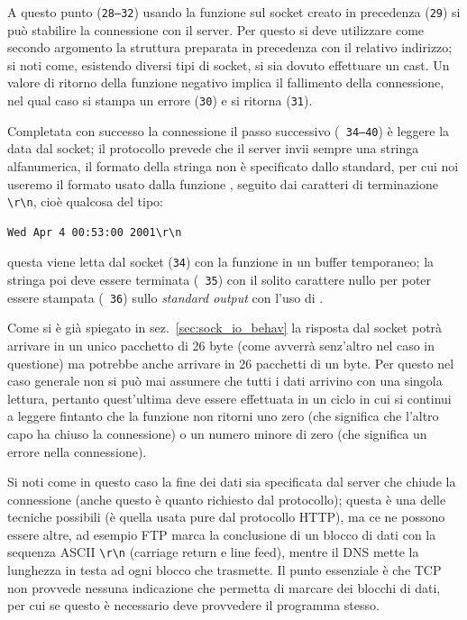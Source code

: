 A questo punto (\texttt{\small 28--32}) usando la funzione  sul
socket creato in precedenza (\texttt{\small 29}) si può stabilire la
connessione con il server. Per questo si deve utilizzare come secondo
argomento la struttura preparata in precedenza con il relativo indirizzo; si
noti come, esistendo diversi tipi di socket, si sia dovuto effettuare un cast.
Un valore di ritorno della funzione negativo implica il fallimento della
connessione, nel qual caso si stampa un errore (\texttt{\small 30}) e si
ritorna (\texttt{\small 31}).

Completata con successo la connessione il passo successivo (\texttt{\small
  34--40}) è leggere la data dal socket; il protocollo prevede che il server
invii sempre una stringa alfanumerica, il formato della stringa non è
specificato dallo standard, per cui noi useremo il formato usato dalla
funzione , seguito dai caratteri di terminazione \verb|\r\n|, cioè
qualcosa del tipo:
\begin{Verbatim}
Wed Apr 4 00:53:00 2001\r\n
\end{Verbatim}
questa viene letta dal socket (\texttt{\small 34}) con la funzione 
in un buffer temporaneo; la stringa poi deve essere terminata (\texttt{\small
  35}) con il solito carattere nullo per poter essere stampata (\texttt{\small
  36}) sullo \textit{standard output} con l'uso di .

Come si è già spiegato in sez.~\ref{sec:sock_io_behav} la risposta dal socket
potrà arrivare in un unico pacchetto di 26 byte (come avverrà senz'altro nel
caso in questione) ma potrebbe anche arrivare in 26 pacchetti di un byte.  Per
questo nel caso generale non si può mai assumere che tutti i dati arrivino con
una singola lettura, pertanto quest'ultima deve essere effettuata in un ciclo
in cui si continui a leggere fintanto che la funzione  non ritorni
uno zero (che significa che l'altro capo ha chiuso la connessione) o un numero
minore di zero (che significa un errore nella connessione).

Si noti come in questo caso la fine dei dati sia specificata dal server che
chiude la connessione (anche questo è quanto richiesto dal protocollo); questa
è una delle tecniche possibili (è quella usata pure dal protocollo HTTP), ma
ce ne possono essere altre, ad esempio FTP marca la conclusione di un blocco
di dati con la sequenza ASCII \verb|\r\n| (carriage return e line feed),
mentre il DNS mette la lunghezza in testa ad ogni blocco che trasmette. Il
punto essenziale è che TCP non provvede nessuna indicazione che permetta di
marcare dei blocchi di dati, per cui se questo è necessario deve provvedere il
programma stesso.

